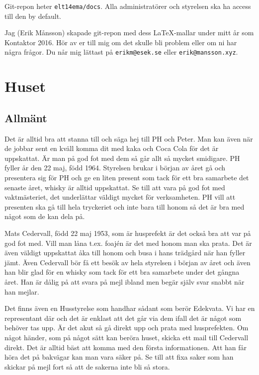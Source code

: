 \documentclass[10pt]{article}
\begin{document}
Git-repon heter \texttt{elt14ema/docs}. Alla administratörer och styrelsen ska ha access till den by default.

Jag (Erik Månsson) skapade git-repon med dess \LaTeX-mallar under mitt år som Kontaktor 2016. Hör av er till mig om det skulle bli problem eller om ni har några frågor. Du når mig lättast på \texttt{erikm@esek.se} eller \texttt{erik@mansson.xyz}.

\section{Huset}

\subsection{Allmänt}

Det är alltid bra att stanna till och säga hej till PH och Peter. Man kan även när de jobbar sent en kväll komma dit med kaka och Coca Cola för det är uppskattat. Är man på god fot med dem så går allt så mycket smidigare. PH fyller år den 22 maj, född 1964. Styrelsen brukar i början av året gå och presentera sig för PH och ge en liten present som tack för ett bra samarbete det senaste året, whisky är alltid uppskattat. Se till att vara på god fot med vaktmästeriet, det underlättar väldigt mycket för verksamheten. PH vill att presenten ska gå till hela tryckeriet och inte bara till honom så det är bra med något som de kan dela på.

Mats Cedervall, född 22 maj 1953, som är husprefekt är det också bra att var på god fot med. Vill man låna t.ex. foajén är det med honom man ska prata. Det är även väldigt uppskattat åka till honom och busa i hans trädgård när han fyller jämt. Även Cedervall bör få ett besök av hela styrelsen i början av året och även han blir glad för en whisky som tack för ett bra samarbete under det gångna året. Han är dålig på att svara på mejl ibland men begär själv svar snabbt när han mejlar.

Det finns även en Husstyrelse som handhar sådant som berör Edekvata. Vi har en representant där och det är enklast att det går via dem ifall det är något som behöver tas upp. Är det akut så gå direkt upp och prata med husprefekten. Om något händer, som på något sätt kan beröra huset, skicka ett mail till Cedervall direkt. Det är alltid bäst att komma med den första informationen. Att han får höra det på bakvägar kan man vara säker på. Se till att fixa saker som han skickar på mejl fort så att de sakerna inte bli så stora.
\end{document}
